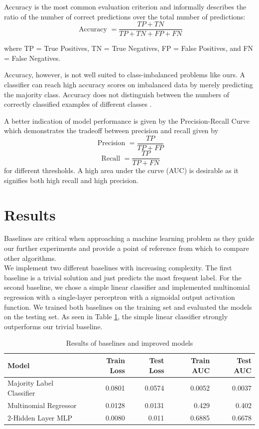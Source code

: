 \documentclass[bsc,frontabs,twoside,singlespacing,parskip,deptreport]{infthesis}     %
\let\Oldsection\section
\renewcommand{\section}{\FloatBarrier\Oldsection}
\begin{document}
Accuracy is the most common evaluation criterion and informally describes the ratio of the number of correct predictions over the total number of predictions:
\[\text { Accuracy }=\frac{T P+T N}{T P+T N+F P+F N}\]

where TP = True Positives, TN = True Negatives, FP = False Positives, and FN = False Negatives.

Accuracy, however, is not well suited to class-imbalanced problems like ours. A classifier can reach high accuracy scores on imbalanced data by merely predicting the majority class. Accuracy does not distinguish between the numbers of correctly classified examples of different classes \cite{galar_review_2012}.

A better indication of model performance is given by the Precision-Recall Curve which demonstrates the tradeoff between precision and recall given by
\[\text { Precision }=\frac{TP}{TP+ FP}\]
\[\text { Recall }=\frac{TP}{TP+ FN}\]
for different thresholds. A high area under the curve (AUC) is desirable as it signifies both high recall and high precision.




\section{Results}
Baselines are critical when approaching a machine learning problem as they guide our further experiments and provide a point of reference from which to compare other algorithms.\\
We implement two different baselines with increasing complexity. The first baseline is a trivial solution and just predicts the most frequent label.
For the second baseline, we chose a simple linear classifier and implemented multinomial regression with a single-layer perceptron with a sigmoidal output activation function.
We trained both baselines on the training set and evaluated the models on the testing set. As seen in Table \ref{baseline_table}, the simple linear classifier strongly outperforms our trivial baseline.

\begin{table}[h!]
\centering
\begin{tabular}{lrrrr}
\toprule
{Model} &  Train Loss &  Test Loss & Train AUC & Test AUC  \\
\midrule
Majority Label Classifier &  0.0801 & 0.0574 & 0.0052 & 0.0037  \\
Multinomial Regressor  & 0.0128 & 0.0131 & 0.429 & 0.402 \\
2-Hidden Layer MLP & 0.0080 & 0.011 & 0.6885 & 0.6678 \\
\bottomrule
\end{tabular}
\caption{Results of baselines and improved models}\label{baseline_table}
\end{table}
\end{document}
